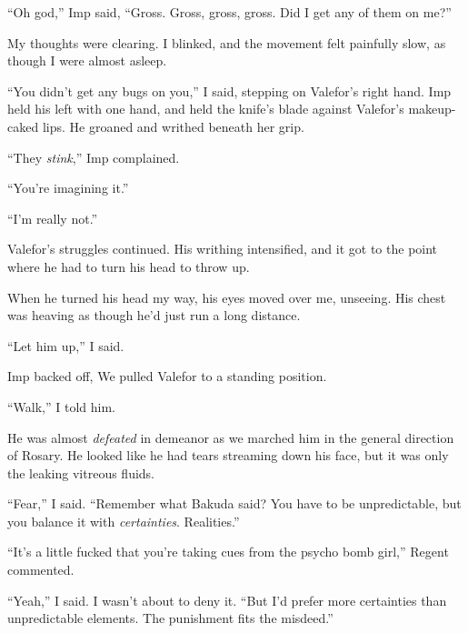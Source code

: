 ``Oh god,'' Imp said, ``Gross.  Gross, gross, gross.  Did I get any of them on me?''



My thoughts were clearing.  I blinked, and the movement felt painfully slow, as though I were almost asleep.



``You didn't get any bugs on you,'' I said, stepping on Valefor's right hand.  Imp held his left with one hand, and held the knife's blade against Valefor's makeup-caked lips.  He groaned and writhed beneath her grip.



``They \emph{stink},'' Imp complained.



``You're imagining it.''



``I'm really not.''



Valefor's struggles continued.  His writhing intensified, and it got to the point where he had to turn his head to throw up.



When he turned his head my way, his eyes moved over me, unseeing.  His chest was heaving as though he'd just run a long distance.



``Let him up,'' I said.



Imp backed off, We pulled Valefor to a standing position.



``Walk,'' I told him.



He was almost \emph{defeated} in demeanor as we marched him in the general direction of Rosary.  He looked like he had tears streaming down his face, but it was only the leaking vitreous fluids.



``Fear,'' I said.  ``Remember what Bakuda said?  You have to be unpredictable, but you balance it with \emph{certainties}.  Realities.''



``It's a little fucked that you're taking cues from the psycho bomb girl,'' Regent commented.



``Yeah,'' I said.  I wasn't about to deny it.  ``But I'd prefer more certainties than unpredictable elements.  The punishment fits the misdeed.''



